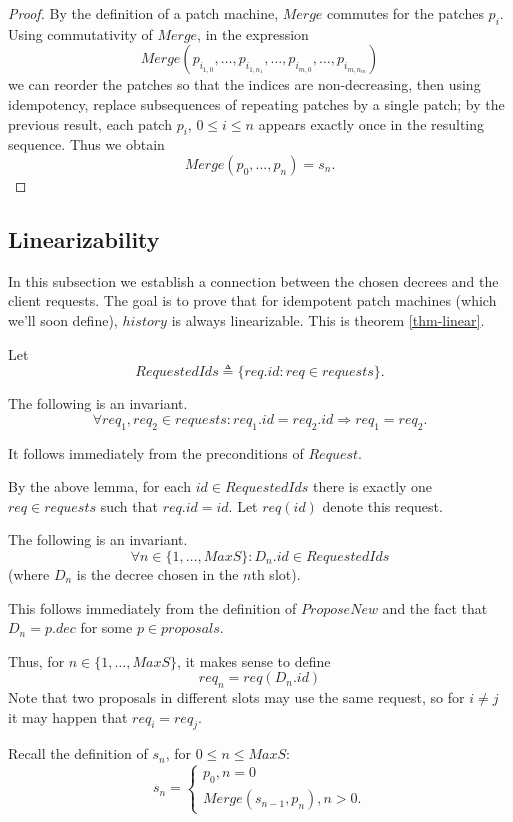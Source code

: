 \documentclass[12pt,a4paper,en]{pracamgr}
\begin{document}
\begin{proof}
    By the definition of a patch machine, $Merge$ commutes for the patches $p_i$. Using commutativity of $Merge$, in the expression
    $$ Merge(p_{i_{1, 0}}, \dots, p_{i_{1, n_1}}, \dots, p_{i_{m, 0}}, \dots, p_{i_{m, n_m}}) $$
    we can reorder the patches so that the indices are non-decreasing, then using idempotency, replace subsequences of repeating patches by a single patch; by the previous result, each patch $p_i$, $0 \le i \le n$ appears exactly once in the resulting sequence. Thus we obtain
    $$ Merge(p_0, \dots, p_n) = s_n. $$
\end{proof}

\subsection{Linearizability}\label{sect-linear}

In this subsection we establish a connection between the chosen decrees and the client requests. The goal is to prove that for idempotent patch machines (which we'll soon define), $history$ is always linearizable. This is theorem \ref{thm-linear}.

Let
$$ RequestedIds \triangleq \{req.id: req \in requests\}. $$

\begin{lemma}
    The following is an invariant.
    $$\forall req_1, req_2 \in requests: req_1.id = req_2.id \Rightarrow req_1 = req_2.$$
\end{lemma}
It follows immediately from the preconditions of $Request$.

By the above lemma, for each $id \in RequestedIds$ there is exactly one $req \in requests$ such that $req.id = id$. Let $req(id)$ denote this request.

\begin{lemma}\label{dec-id-requested}
    The following is an invariant.
    $$ \forall n \in \{1, \dots, MaxS\}: D_n.id \in RequestedIds $$
    (where $D_n$ is the decree chosen in the $n$th slot).
\end{lemma}
This follows immediately from the definition of $ProposeNew$ and the fact that $D_n = p.dec$ for some $p \in proposals$.

Thus, for $n \in \{1, \dots, MaxS\}$, it makes sense to define
$$ req_n = req(D_n.id) $$
Note that two proposals in different slots may use the same request, so for $i \neq j$ it may happen that $req_i = req_j$.

Recall the definition of $s_n$, for $0 \le n \le MaxS$:
$$ s_n = \begin{cases} p_0, n = 0\\ Merge(s_{n-1}, p_n), n > 0. \end{cases} $$
\end{document}
